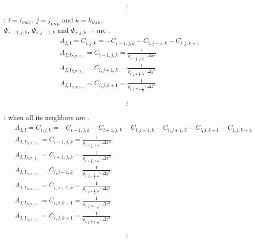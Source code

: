\documentclass{article}
\numberwithin{equation}{subsection}
\begin{document}
\begin{equation}
\vdots
\end{equation}

: $i = i_{max}$, $j = j_{min}$ and $k = k_{min}$, \\
$\Phi_{i+1,j,k}$, $\Phi_{i,j-1,k}$ and $\Phi_{i,j,k-1}$ are .\\
\begin{align}
\begin{split}
& A_{I, I} = C_{i,j,k} = - C_{i-1,j,k} - C_{i,j+1,k} - C_{i,j,k+1} \\ 
& A_{I, I_{NB(0)}} = C_{i-1,j,k} = \frac{1}{\rho_{i-\frac{1}{2},j,k} \cdot \Delta x^2} \\
& A_{I, I_{NB(3)}} = C_{i,j+1,k} = \frac{1}{\rho_{i,j+\frac{1}{2},k} \cdot \Delta y^2} \\
& A_{I, I_{NB(5)}} = C_{i,j,k+1} = \frac{1}{\rho_{i,j,k+\frac{1}{2}} \cdot \Delta z^2}
\end{split}
\end{align}


\begin{equation}
\vdots
\end{equation}

: when all its neighbors are .
\begin{align}
\begin{split}
& A_{I, I} = C_{i,j,k} = -C_{i-1,j,k} - C_{i+1,j,k} - C_{i,j-1,k} - C_{i,j+1,k} - C_{i,j,k-1} - C_{i,j,k+1} \\
& A_{I, I_{NB(0)}} = C_{i-1,j,k} = \frac{1}{\rho_{i-\frac{1}{2},j,k} \cdot \Delta x^2} \\
& A_{I, I_{NB(1)}} = C_{i+1,j,k} = \frac{1}{\rho_{i+\frac{1}{2},j,k} \cdot \Delta x^2} \\
& A_{I, I_{NB(2)}} = C_{i,j-1,k} = \frac{1}{\rho_{i,j-\frac{1}{2},k} \cdot \Delta y^2} \\
& A_{I, I_{NB(3)}} = C_{i,j+1,k} = \frac{1}{\rho_{i,j+\frac{1}{2},k} \cdot \Delta y^2} \\
& A_{I, I_{NB(4)}} = C_{i,j,k-1} = \frac{1}{\rho_{i,j,k-\frac{1}{2}} \cdot \Delta z^2} \\
& A_{I, I_{NB(5)}} = C_{i,j,k+1} = \frac{1}{\rho_{i,j,k+\frac{1}{2}} \cdot \Delta z^2}
\end{split}
\end{align}


\begin{equation}
\vdots
\end{equation}
\end{document}
